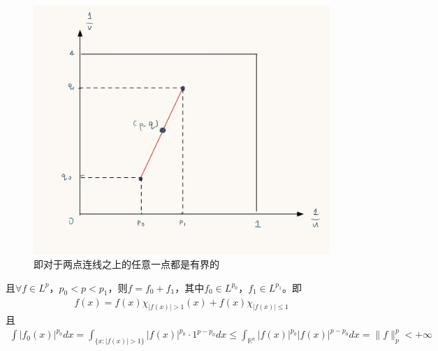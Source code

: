 \begin{figure}[H]
    \centering
    \includegraphics[width=0.5\linewidth]{fig/riesz-thorin-fig.jpg}
    \caption{即对于两点连线之上的任意一点都是有界的}
    \label{fig:Riesz-Thorin}
\end{figure}

且$\forall f\in L^p$，$p_0 < p < p_1$，则$f=f_0+f_1$，其中$f_0\in L^{p_0}$，$f_1\in L^{p_1}$。即
\begin{align*}
    f(x) = f(x)\chi_{ |f(x)| > 1 }(x) + f(x) \chi_{|f(x)| \leqslant 1}
\end{align*}
且
\begin{align*}
    \int |f_0(x)|^{p_0} dx = \int_{\{x: |f(x)| > 1\}} |f(x)|^{p_0} \cdot 1^{p-p_0} dx \leqslant \int_{\mathbb{R}^n} |f(x)|^{p_0} |f(x)|^{p-p_0} dx = \|f\|_p^p < +\infty
\end{align*}

